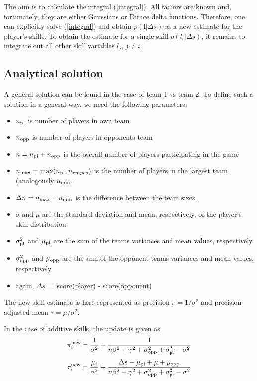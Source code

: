 \documentclass{article}
\begin{document}
The aim is to calculate the integral (\ref{integral}). All factors are known and, fortunately, they are either Gaussians or Dirace delta functions. Therefore, one can explicitly solve (\ref{integral}) and obtain $p(\mathbf{l} | \Delta s) $ as a new estimate for the player's skills. To obtain the estimate for a single skill $p(l_i | \Delta s)$, it remains to integrate out all other skill variables $l_j$, $j\neq i$.


\subsection{Analytical solution}

A general solution can be found in the case of team 1 vs team 2. To define such a solution in a general way, we need the following parameters:
\begin{itemize}
\item $n_{\rm pl}$ is number of players in own team
\item $n_{\rm opp}$ is number of players in opponents team
\item $ n = n_{\rm pl} + n_{\rm opp}$ is the overall number of players participating in the game
\item $n_{\rm max} = \max(n_{\rm pl},n_{rm pop})$ is the number of players in the largest team (analogously $n_{\rm min}$.
\item $\Delta n = n_{\rm max} - n_{\rm min}$ is the difference between the team sizes. 
\item $\sigma$ and $\mu$ are the standard deviation and mean, respectively, of the player's skill distribution. 
\item $\sigma_{\rm pl}^2 $ and $\mu_{\rm pl}$ are the sum of the teams variances and mean values, respectively
\item $\sigma_{\rm opp}^2 $ and $\mu_{\rm opp}$ are the sum of the opponent teams variances and mean values, respectively
\item again, $\Delta s = $ score(player) - score(opponent)
\end{itemize}
The new skill estimate is here represented as precision $\pi = 1/\sigma^2$ and precision adjusted mean $\tau = \mu/\sigma^2$. 


In the case of additive skills, the update is given as 
\begin{equation}
\pi_i^{\rm new} = \frac{1}{\sigma^2} +  \frac{1}{n \beta^2 + \gamma^2 + \sigma_{\rm opp}^2 + \sigma_{\rm pl}^2 - \sigma^2 }
\end{equation}
\begin{equation}
\tau_i^{\rm new} = \frac{\mu_i}{\sigma^2} +  \frac{\Delta s - \mu_{\rm pl} + \mu + \mu_{\rm opp}}{n \beta^2 + \gamma^2 + \sigma_{\rm opp}^2 + \sigma_{\rm pl}^2 - \sigma^2 }
\end{equation}
\end{document}
